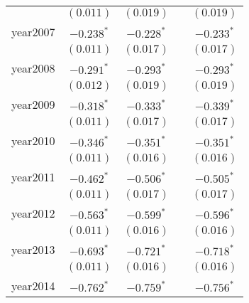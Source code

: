 \begin{center}
\begin{longtable}{l c c c c}
                         & $(0.011)$             & $(0.019)$             &                       & $(0.019)$             \\
year2007                 & $\mathbf{-0.238}^{*}$ & $\mathbf{-0.228}^{*}$ &                       & $\mathbf{-0.233}^{*}$ \\
                         & $(0.011)$             & $(0.017)$             &                       & $(0.017)$             \\
year2008                 & $\mathbf{-0.291}^{*}$ & $\mathbf{-0.293}^{*}$ &                       & $\mathbf{-0.293}^{*}$ \\
                         & $(0.012)$             & $(0.019)$             &                       & $(0.019)$             \\
year2009                 & $\mathbf{-0.318}^{*}$ & $\mathbf{-0.333}^{*}$ &                       & $\mathbf{-0.339}^{*}$ \\
                         & $(0.011)$             & $(0.017)$             &                       & $(0.017)$             \\
year2010                 & $\mathbf{-0.346}^{*}$ & $\mathbf{-0.351}^{*}$ &                       & $\mathbf{-0.351}^{*}$ \\
                         & $(0.011)$             & $(0.016)$             &                       & $(0.016)$             \\
year2011                 & $\mathbf{-0.462}^{*}$ & $\mathbf{-0.506}^{*}$ &                       & $\mathbf{-0.505}^{*}$ \\
                         & $(0.011)$             & $(0.017)$             &                       & $(0.017)$             \\
year2012                 & $\mathbf{-0.563}^{*}$ & $\mathbf{-0.599}^{*}$ &                       & $\mathbf{-0.596}^{*}$ \\
                         & $(0.011)$             & $(0.016)$             &                       & $(0.016)$             \\
year2013                 & $\mathbf{-0.693}^{*}$ & $\mathbf{-0.721}^{*}$ &                       & $\mathbf{-0.718}^{*}$ \\
                         & $(0.011)$             & $(0.016)$             &                       & $(0.016)$             \\
year2014                 & $\mathbf{-0.762}^{*}$ & $\mathbf{-0.759}^{*}$ &                       & $\mathbf{-0.756}^{*}$ \\

\end{longtable}
\end{center}
